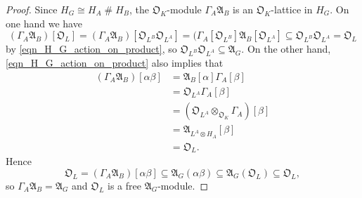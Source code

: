 \documentclass[12pt,a4paper, reqno]{amsart}
\theoremstyle{definition}
\def \O {\mathfrak{O}}
\def \A {\mathfrak{A}}
\begin{document}
\begin{proof}
Since $ H_{G} \cong H_{A} \; \# \; H_{B} $, the $ \O_{K} $-module $ \Gamma_{A}\A_{B} $ is an $ \O_{K} $-lattice in $ H_{G} $. On one hand we have
\[ (\Gamma_{A}\A_{B})[\O_{L}] = (\Gamma_{A}\A_{B})[\O_{L^{B}}\O_{L^{A}}] = (\Gamma_{A}[\O_{L^{B}}]\A_{B}[\O_{L^{A}}] \subseteq \O_{L^{B}}\O_{L^{A}} = \O_{L} \]
by \eqref{eqn_H_G_action_on_product}, so $ \O_{L^{B}}\O_{L^{A}} \subseteq \A_{G} $. On the other hand, \eqref{eqn_H_G_action_on_product} also implies that
\begin{align*}
(\Gamma_{A}\A_{B})[\alpha\beta] & = \A_{B}[\alpha]\Gamma_{A}[\beta] \\
& = \O_{L^{A}}\Gamma_{A}[\beta] \\
& = (\O_{L^{A}} \otimes_{\O_{K}} \Gamma_{A})[\beta] \\
& = \A_{L^{A} \otimes H_{A}}[\beta] \\
& = \O_{L}.
\end{align*}
Hence
\[ \O_{L} = (\Gamma_{A}\A_{B})[\alpha\beta] \subseteq \A_{G}(\alpha\beta) \subseteq \A_{G}(\O_{L}) \subseteq \O_{L}, \]
so $ \Gamma_{A}\A_{B} = \A_{G} $ and $ \O_{L} $ is a free $ \A_{G} $-module. 
\end{proof}
\end{document}
